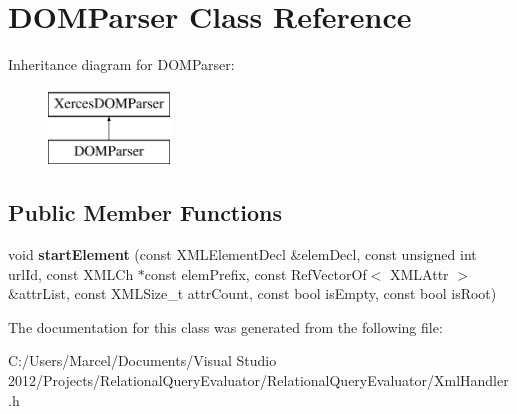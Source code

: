 \hypertarget{class_d_o_m_parser}{\section{D\+O\+M\+Parser Class Reference}
\label{class_d_o_m_parser}
}
Inheritance diagram for D\+O\+M\+Parser\+:\begin{figure}[H]
\begin{center}
\leavevmode
\includegraphics[height=2.000000cm]{class_d_o_m_parser}
\end{center}
\end{figure}
\subsection*{Public Member Functions}
\begin{DoxyCompactItemize}
\item 
\hypertarget{class_d_o_m_parser_ad1d0d1baa8de927488a0a528d6ef0298}{void {\bfseries start\+Element} (const X\+M\+L\+Element\+Decl \&elem\+Decl, const unsigned int url\+Id, const X\+M\+L\+Ch $\ast$const elem\+Prefix, const Ref\+Vector\+Of$<$ X\+M\+L\+Attr $>$ \&attr\+List, const X\+M\+L\+Size\+\_\+t attr\+Count, const bool is\+Empty, const bool is\+Root)}\label{class_d_o_m_parser_ad1d0d1baa8de927488a0a528d6ef0298}

\end{DoxyCompactItemize}


The documentation for this class was generated from the following file\+:\begin{DoxyCompactItemize}
\item 
C\+:/\+Users/\+Marcel/\+Documents/\+Visual Studio 2012/\+Projects/\+Relational\+Query\+Evaluator/\+Relational\+Query\+Evaluator/Xml\+Handler.\+h\end{DoxyCompactItemize}
